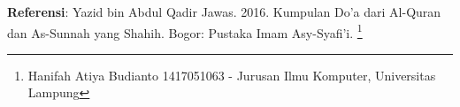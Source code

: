 \documentclass[a4paper,12pt]{article}
\begin{document}
\textbf{Referensi}: Yazid bin Abdul Qadir Jawas. 2016. Kumpulan Do'a dari
Al-Quran dan As-Sunnah yang Shahih. Bogor: Pustaka Imam Asy-Syafi'i.
\footnote{Hanifah Atiya Budianto 1417051063 - Jurusan Ilmu Komputer,
Universitas Lampung}
\end{document}
